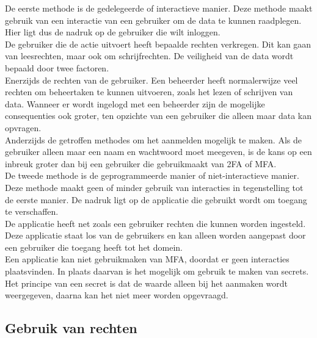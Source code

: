 De eerste methode is de gedelegeerde of interactieve manier. Deze methode maakt gebruik van een interactie van een gebruiker om de data te kunnen raadplegen. Hier ligt dus de nadruk op de gebruiker die wilt inloggen. \\

De gebruiker die de actie uitvoert heeft bepaalde rechten verkregen. Dit kan gaan van leesrechten, maar ook om schrijfrechten. De veiligheid van de data wordt bepaald door twee factoren. \\

Enerzijds de rechten van de gebruiker. Een beheerder heeft normalerwijze veel rechten om beheertaken te kunnen uitvoeren, zoals het lezen of schrijven van data. Wanneer er wordt ingelogd met een beheerder zijn de mogelijke consequenties ook groter, ten opzichte van een gebruiker die alleen maar data kan opvragen. \\ 

Anderzijds de getroffen methodes om het aanmelden mogelijk te maken. Als de gebruiker alleen maar een naam en wachtwoord moet meegeven, is de kans op een inbreuk groter dan bij een gebruiker die gebruikmaakt van \ac{2FA} of \Ac{MFA}. \\

De tweede methode is de geprogrammeerde manier of niet-interactieve manier. Deze methode maakt geen of minder gebruik van interacties in tegenstelling tot de eerste manier. De nadruk ligt op de applicatie die gebruikt wordt om toegang te verschaffen. \\

De applicatie heeft net zoals een gebruiker rechten die kunnen worden ingesteld. Deze applicatie staat los van de gebruikers en kan alleen worden aangepast door een gebruiker die toegang heeft tot het domein. \\

Een applicatie kan niet gebruikmaken van \ac{MFA}, doordat er geen interacties plaatsvinden. In plaats daarvan is het mogelijk om gebruik te maken van secrets. Het principe van een secret is dat de waarde alleen bij het aanmaken wordt weergegeven, daarna kan het niet meer worden opgevraagd.

\subsection{Gebruik van rechten}



